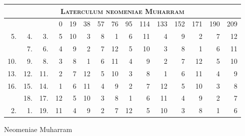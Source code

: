 %
\begin{tabnums} %
\normalsize
\centering
\newcommand{\hts}{\normalsize}
%
\newcommand{\da}{\scriptsize{†}}
\begin{tabular}{@{} r r r *{12}{r} @{}}
\toprule
\multicolumn{15}{c}{\Large\textsc{Laterculum neomeniae Muharram}} \\
\toprule
  ~ & ~ & ~ &
  \hts{0} & \hts{19} & \hts{38} & \hts{57} & \hts{76} & \hts{95} &
  \hts{114} & \hts{133} & \hts{152} & \hts{171} & \hts{190} & \hts{209}
\\
\cmidrule(l){4-15}
 5. &  4. &  3. &  5 & 10 &  3 & 8 &  1 &  6 & 11 &  4 & 9 &  2 & 7 & 12 \\
    &  7. &  6. &  4 &  9 &  2 & 7 & 12 &  5 & 10 &  3 & 8 &  1 & 6 & 11 \\
10. &  9. &  8. &  3 &  8 &  1 & 6 & 11 &  4 &  9 &  2 & 7 & 12 & 5 & 10 \\
13. & 12. & 11. &  2 &  7 & 12 & 5 & 10 &  3 &  8 &  1 & 6 & 11 & 4 &  9 \\
16. & 15. & 14. &  1 &  6 & 11 & 4 &  9 &  2 &  7 & 12 & 5 & 10 & 3 &  8 \\
    & 18. & 17. & 12 &  5 & 10 & 3 &  8 &  1 &  6 & 11 & 4 &  9 & 2 &  7 \\
 2. &  1. & 19. & 11 &  4 &  9 & 2 &  7 & 12 &  5 & 10 & 3 &  8 & 1 &  6 \\
\bottomrule
\end{tabular}
%
\caption{Neomeniae Muharram}
\label{tab:p140}
%
\end{tabnums}
